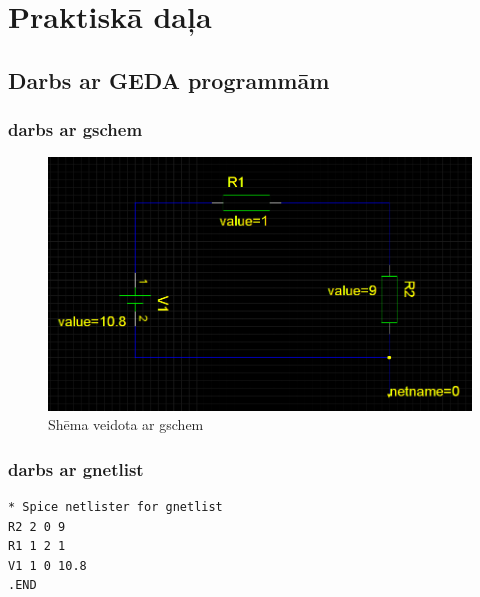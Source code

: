 \documentclass{report}
\begin{document}
\chapter{Praktiskā daļa}
\section{Darbs ar GEDA programmām}
\subsection{darbs ar gschem}

    \begin{figure}[!htb]
    \centering
        \includegraphics[scale=0.4]{1}
        \caption{Shēma veidota ar gschem}
    \end{figure} \newpage


\subsection{darbs ar gnetlist}
\begin{verbatim}
* Spice netlister for gnetlist
R2 2 0 9
R1 1 2 1
V1 1 0 10.8
.END
\end{verbatim}
\end{document}
